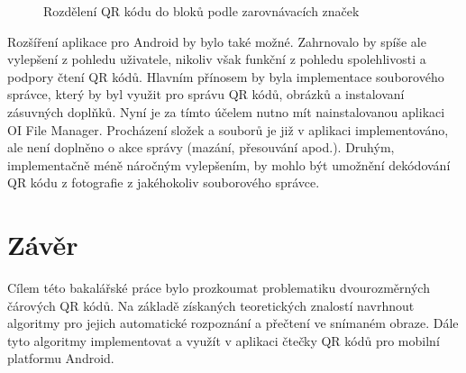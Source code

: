   \begin{figure}[H]
  \begin{center}
    \caption{Rozdělení QR kódu do bloků podle zarovnávacích značek}
    \label{alignmentBlocks}
  \end{center}
\end{figure}
 
Rozšíření aplikace pro Android by bylo také možné. Zahrnovalo by spíše ale
vylepšení z pohledu uživatele, nikoliv však funkční z pohledu spolehlivosti 
a podpory čtení QR kódů. Hlavním přínosem by byla implementace souborového
správce, který by byl využit pro správu QR kódů, obrázků a instalovaní zásuvných
doplňků. Nyní je za tímto účelem nutno mít nainstalovanou aplikaci OI File
Manager. Procházení složek a souborů je již v aplikaci implementováno, ale není
doplněno o akce správy (mazání, přesouvání apod.). Druhým, implementačně méně
náročným vylepšením, by mohlo být umožnění dekódování QR kódu z fotografie z
jakéhokoliv souborového správce.

\chapter{Závěr}

Cílem této bakalářské práce bylo prozkoumat problematiku dvourozměrných čárových
QR kódů. Na základě získaných teoretických znalostí navrhnout algoritmy pro
jejich automatické rozpoznání a přečtení ve snímaném obraze. Dále tyto algoritmy
implementovat a využít v aplikaci čtečky QR kódů pro mobilní platformu Android.

